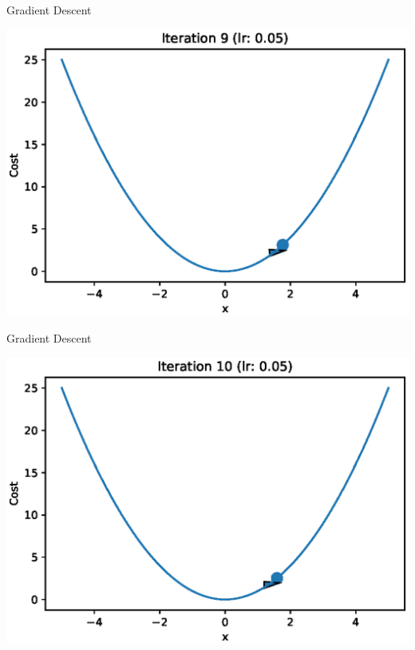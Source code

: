 \documentclass{beamer}
\begin{document}
	\begin{frame}{Gradient Descent}
		\begin{center}
			\includegraphics[totalheight=6cm]{gradient-descent/iteration-9.eps}
		\end{center}
	\end{frame}
	
	\begin{frame}{Gradient Descent}
		\begin{center}
			\includegraphics[totalheight=6cm]{gradient-descent/iteration-10.eps}
		\end{center}
	\end{frame}
	
\end{document}
